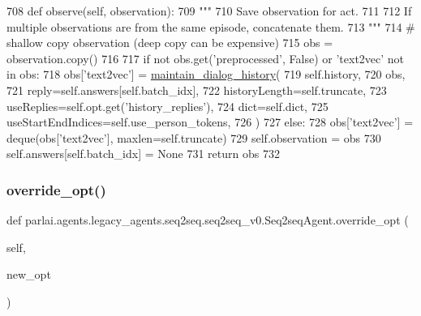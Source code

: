 \begin{DoxyCode}
708     \textcolor{keyword}{def }observe(self, observation):
709         \textcolor{stringliteral}{"""}
710 \textcolor{stringliteral}{        Save observation for act.}
711 \textcolor{stringliteral}{}
712 \textcolor{stringliteral}{        If multiple observations are from the same episode, concatenate them.}
713 \textcolor{stringliteral}{        """}
714         \textcolor{comment}{# shallow copy observation (deep copy can be expensive)}
715         obs = observation.copy()
716 
717         \textcolor{keywordflow}{if} \textcolor{keywordflow}{not} obs.get(\textcolor{stringliteral}{'preprocessed'}, \textcolor{keyword}{False}) \textcolor{keywordflow}{or} \textcolor{stringliteral}{'text2vec'} \textcolor{keywordflow}{not} \textcolor{keywordflow}{in} obs:
718             obs[\textcolor{stringliteral}{'text2vec'}] = \hyperlink{namespaceparlai_1_1agents_1_1legacy__agents_1_1seq2seq_1_1utils__v0_ac7cb3ffae208474d6e67f37ecfe07f64}{maintain\_dialog\_history}(
719                 self.history,
720                 obs,
721                 reply=self.answers[self.batch\_idx],
722                 historyLength=self.truncate,
723                 useReplies=self.opt.get(\textcolor{stringliteral}{'history\_replies'}),
724                 dict=self.dict,
725                 useStartEndIndices=self.use\_person\_tokens,
726             )
727         \textcolor{keywordflow}{else}:
728             obs[\textcolor{stringliteral}{'text2vec'}] = deque(obs[\textcolor{stringliteral}{'text2vec'}], maxlen=self.truncate)
729         self.observation = obs
730         self.answers[self.batch\_idx] = \textcolor{keywordtype}{None}
731         \textcolor{keywordflow}{return} obs
732 
\end{DoxyCode}
\mbox{\label{classparlai_1_1agents_1_1legacy__agents_1_1seq2seq_1_1seq2seq__v0_1_1Seq2seqAgent_ad40d38a1cc2cafe32c43477740b4a164}} 
\subsubsection{\texorpdfstring{override\+\_\+opt()}{override\_opt()}}
{\footnotesize\ttfamily def parlai.\+agents.\+legacy\+\_\+agents.\+seq2seq.\+seq2seq\+\_\+v0.\+Seq2seq\+Agent.\+override\+\_\+opt (\begin{DoxyParamCaption}\item[{}]{self,  }\item[{}]{new\+\_\+opt }\end{DoxyParamCaption})}

